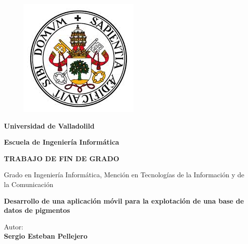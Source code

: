 \begin{titlepage}

\begin{center}
\thisfancypage{\setlength{\fboxsep}{20pt}\doublebox}{}
\begin{figure}[htb]
\begin{center}
\includegraphics[scale=0.5]{imagenes/logo.jpg}
\end{center}
\end{figure}

\begin{LARGE}
\textbf{Universidad de Valladolild}
\end{LARGE}

\vspace*{0.8in}
\begin{Huge}
\textbf{Escuela de Ingeniería Informática}
\end{Huge}

\vspace*{0.4in}
\begin{Large}
\textbf{TRABAJO DE FIN DE GRADO}
\end{Large}

\vspace*{1in}
\begin{LARGE}
Grado en Ingeniería Informática, Mención en Tecnologías de la Información y de la Comunicación
\end{LARGE}

\vspace{0.6in}
\begin{Huge}
\textbf{Desarrollo de una aplicación móvil para la explotación de una base de datos de pigmentos}
\end{Huge}

\vspace{0.6in}
\begin{flushright}
\begin{Large}
Autor:\\
\textbf{Sergio Esteban Pellejero}
\end{Large}
\end{flushright}
\end{center}
\end{titlepage}

